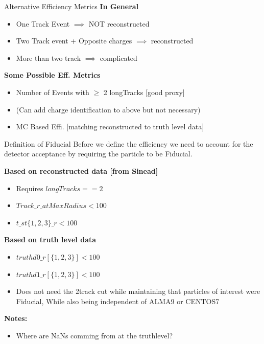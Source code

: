 \begin{frame}{Alternative Efficiency Metrics}
    \textbf{In General}
	\begin{itemize}
        \item One Track Event $\implies$ NOT reconstructed
        \item Two Track event + Opposite charges $\implies$ reconstructed 
        \item More than two track $\implies$ complicated
    \end{itemize}
    \vspace{1 cm}
    \textbf{Some Possible Eff. Metrics}
    \begin{itemize}
        \item Number of Events with $\geq$ 2 longTracks [good proxy]
        \item (Can add charge identification to above but not necessary)
        \item MC Based Effi. [matching reconstructed to truth level data]
    \end{itemize}
\end{frame}

\begin{frame}{Definition of Fiducial}
    Before we define the efficiency we need to account for the detector acceptance by requiring the particle to be Fiducial.

		\textbf{Based on reconstructed data [from Sinead]}
		\begin{itemize}
			\item Requires $longTracks == 2$ 
			\item $Track\_r\_atMaxRadius < 100$
			\item $t\_st\{1,2,3\}\_r < 100$
 		\end{itemize}
		\textbf{Based on truth level data }
		\begin{itemize}
			\item $truthd0\_r [\{1,2,3\}] < 100$
			\item $truthd1\_r [\{1,2,3\}] < 100$
			\item Does not need the 2track cut while maintaining that particles of interest were Fiducial, While also being independent of ALMA9 or CENTOS7
	
		\end{itemize}

        \textbf{Notes:}
        \begin{itemize}
		\item Where are NaNs comming from at the truthlevel?
	    \end{itemize}	
\end{frame}

